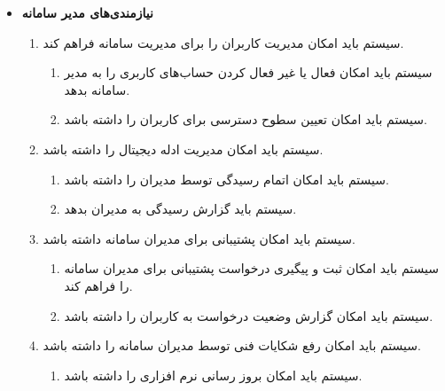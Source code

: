 \documentclass[12pt,a4paper,oneside]{article}
\begin{document}
	\begin{itemize}
		\item
		\textbf{نیازمندی‌های مدیر سامانه}
		\begin{enumerate}
			\renewcommand{\labelenumi}{\rl{{\arabic{enumi}}}R-}
	
			\item 
			سیستم باید امکان مدیریت کاربران را برای مدیریت سامانه فراهم کند.
			\begin{enumerate}
				\renewcommand{\labelenumii}{{\rl{\arabic{enumii}.\arabic{enumi}}}R-}
				\item 
				سیستم باید امکان فعال یا غیر فعال کردن حساب‌های کاربری را به مدیر سامانه بدهد.
				\item 
				سیستم باید امکان تعیین سطوح دسترسی برای کاربران را داشته باشد.
			\end{enumerate}
	
			\item 
			سیستم باید امکان مدیریت ادله دیجیتال را داشته باشد.
			\begin{enumerate}
				\renewcommand{\labelenumii}{{\rl{\arabic{enumii}.\arabic{enumi}}}R-}
				\item 
				سیستم باید امکان اتمام رسیدگی توسط مدیران را داشته باشد.
				\item 
				سیستم باید گزارش رسیدگی به مدیران بدهد.
			\end{enumerate}
	
			\item 
			سیستم باید امکان پشتیبانی برای مدیران سامانه داشته باشد.
			\begin{enumerate}
				\renewcommand{\labelenumii}{{\rl{\arabic{enumii}.\arabic{enumi}}}R-}
				\item 
				سیستم باید امکان ثبت و پیگیری درخواست پشتیبانی برای مدیران سامانه را فراهم کند.
				\item 
				سیستم باید امکان گزارش وضعیت درخواست به کاربران را داشته باشد.
			\end{enumerate}
	
			\item 
			سیستم باید امکان رفع شکایات فنی توسط مدیران سامانه را داشته باشد.
			\begin{enumerate}
				\renewcommand{\labelenumii}{{\rl{\arabic{enumii}.\arabic{enumi}}}R-}
				\item 
				سیستم باید امکان بروز رسانی نرم افزاری را داشته باشد.
			\end{enumerate}
	

\end{enumerate}
\end{itemize}
\end{document}
